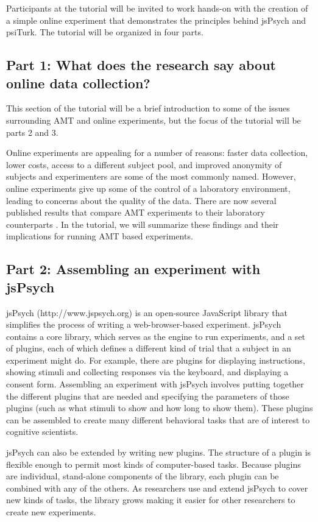 \documentclass[10pt,letterpaper]{article}
\begin{document}
Participants at the tutorial will be invited to work hands-on with the creation of a simple online experiment that demonstrates the principles behind jsPsych and psiTurk. The tutorial will be organized in four parts.

\subsection{Part 1: What does the research say about online data collection?}

This section of the tutorial will be a brief introduction to some of the issues surrounding AMT and online experiments, but the focus of the tutorial will be parts 2 and 3.

Online experiments are appealing for a number of reasons: faster data collection, lower costs, access to a different subject pool, and improved anonymity of subjects and experimenters are some of the most commonly named. However, online experiments give up some of the control of a laboratory environment, leading to concerns about the quality of the data. There are now several published results that compare AMT experiments to their laboratory counterparts \cite{paolacci2010running, buhrmester2011amazon, zwann2012revisiting, crump2013evaluating, goodman2013data}. In the tutorial, we will summarize these findings and their implications for running AMT based experiments. 
  
\subsection{Part 2: Assembling an experiment with jsPsych}

jsPsych (http://www.jspsych.org) is an open-source JavaScript library that simplifies the process of writing a web-browser-based experiment. jsPsych contains a core library, which serves as the engine to run experiments, and a set of plugins, each of which defines a different kind of trial that a subject in an experiment might do. For example, there are plugins for displaying instructions, showing stimuli and collecting responses via the keyboard, and displaying a consent form. Assembling an experiment with jsPsych involves putting together the different plugins that are needed and specifying the parameters of those plugins (such as what stimuli to show and how long to show them). These plugins can be assembled to create many different behavioral tasks that are of interest to cognitive scientists.

jsPsych can also be extended by writing new plugins. The structure of a plugin is flexible enough to permit most kinds of computer-based tasks. Because plugins are individual, stand-alone components of the library, each plugin can be combined with any of the others. As researchers use and extend jsPsych to cover new kinds of tasks, the library grows making it easier for other researchers to create new experiments.
\end{document}
